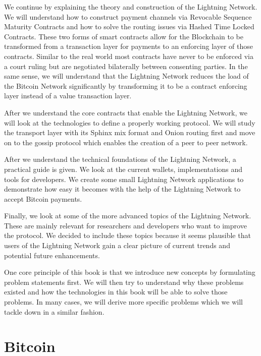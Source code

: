 \documentclass[ebook,12pt,oneside,openany]{memoir}
\begin{document}
We continue by explaining the theory and construction of the Lightning Network.
We will understand how to construct payment channels via Revocable Sequence Maturity Contracts and how to solve the routing issues via Hashed Time Locked Contracts.
These two forms of smart contracts allow for the Blockchain to be transformed from a transaction layer for payments to an enforcing layer of those contracts.
Similar to the real world most contracts have never to be enforced via a court ruling but are negotiated bilaterally between consenting parties.
In the same sense, we will understand that the Lightning Network reduces the load of the Bitcoin Network significantly by transforming it to be a contract enforcing layer instead of a value transaction layer.

After we understand the core contracts that enable the Lightning Network, we will look at the technologies to define a properly working protocol.
We will study the transport layer with its Sphinx mix format and Onion routing first and move on to the gossip protocol which enables the creation of a peer to peer network.

After we understand the technical foundations of the Lightning Network, a practical guide is given.
We look at the current wallets, implementations and tools for developers.
We create some small Lightning Network applications to demonstrate how easy it becomes with the help of the Lightning Network to accept Bitcoin payments.

Finally, we look at some of the more advanced topics of the Lightning Network.
These are mainly relevant for researchers and developers who want to improve the protocol.
We decided to include these topics because it seems plausible that users of the Lightning Network gain a clear picture of current trends and potential future enhancements. 

One core principle of this book is that we introduce new concepts by formulating problem statements first. We will then try to understand why these problems existed and how the technologies in this book will be able to solve those problems. In many cases, we will derive more specific problems which we will tackle down in a similar fashion.

\chapter{Bitcoin}
\end{document}
